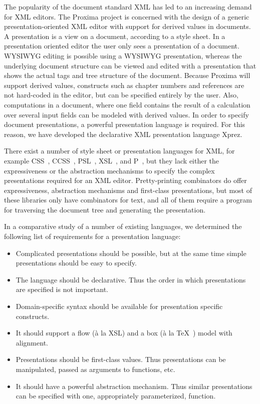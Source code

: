 \par The popularity of the document standard XML has led to an increasing
      demand for XML editors. The Proxima project is concerned with the design of a
      generic presentation-oriented XML editor with support for derived values in
      documents. A presentation is a view on a document, according to a style sheet.
      In a presentation oriented editor the user only sees a presentation of a
      document. WYSIWYG editing is possible using a WYSIWYG presentation, whereas the
      underlying document structure can be viewed and edited with a presentation that
      shows the actual tags and tree structure of the document. Because Proxima will
      support derived values, constructs such as chapter numbers and references are
      not hard-coded in the editor, but can be specified entirely by the user. Also,
      computations in a document, where one field contains the result of a
      calculation over several input fields can be modeled with derived values. In
      order to specify document presentations, a powerful presentation language is
      required. For this reason, we have developed the declarative XML presentation
      language {\sc Xprez}.
\par There exist a number of style sheet or presentation languages for XML,
      for example CSS~\cite{css}, CCSS~\cite{ccss},
      PSL~\cite{psl}, XSL~\cite{xsl}, and P~\cite{thot}, but they lack either the expressiveness or the abstraction
      mechanisms to specify the complex presentations required for an XML editor.
      Pretty-printing combinators \cite{oppen,swierstra,hughes,kahl,brand} do offer expressiveness, abstraction mechanisms and
      first-class presentations, but most of these libraries only have combinators
      for text, and all of them require a program for traversing the document tree
      and generating the presentation. 
\par In a comparative study of a number of existing languages, we determined
      the following list of requirements for a presentation language:
 \begin{itemize}
 
 \item  Complicated presentations should be possible, but at the same time
        simple presentations should be easy to specify.
 \item The language should be declarative. Thus the order in which
        presentations are specified is not important.
 \item  Domain-specific syntax should be available for presentation specific
        constructs. 
 \item It should support a flow (\`a la XSL) and a box (\`a la
        \TeX~\cite{tex}) model with
        alignment.
 \item  Presentations should be first-class values. Thus presentations can
        be manipulated, passed as arguments to functions, etc.
 \item  It should have a powerful abstraction mechanism. Thus similar
        presentations can be specified with one, appropriately parameterized,
        function.
 \end{itemize}

